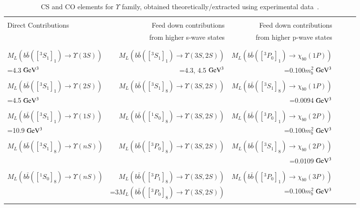 \normalsize
\begin{table}
  \centering
  \caption{CS and CO elements for $\Upsilon$ family, obtained theoretically/extracted using experimental data~\cite{Sharma:2012dy,Feng:2015wka}.}
  \footnotesize
  \begin{tabular*}{\textwidth}{@{\extracolsep{\fill}}lrrrrl@{}}
    \hline
    \hline
    & & \\ 
    Direct Contributions & Feed down contributions & Feed down contributions \\
    & from higher s-wave states & from higher p-wave states \\ \\
    \hline 
    & & \\
    $M_L(b\bar{b}([^3S_1]_1)\rightarrow\Upsilon(3S))$ & $M_L(b\bar{b}([^3S_1]_1)\rightarrow\Upsilon(3S,2S))$
    & $M_L(b\bar{b}([^3P_0]_1)\rightarrow\chi_{b0}(1P))$ \\
    =4.3 ${\rm GeV^3}$ & =4.3, 4.5 ${\rm GeV^3}$ & =0.100$m_b^2$ ${\rm GeV^3}$ \\ \\
    
    $M_L(b\bar{b}([^3S_1]_1)\rightarrow\Upsilon(2S))$ & $M_L(b\bar{b}([^3S_1]_8)\rightarrow\Upsilon(3S,2S))$
    & $M_L(b\bar{b}([^3S_1]_8)\rightarrow\chi_{b0}(1P))$ \\
    =4.5 ${\rm GeV^3}$ & & =0.0094 ${\rm GeV^3}$ \\ \\
    
    $M_L(b\bar{b}([^3S_1]_1)\rightarrow\Upsilon(1S))$ & $M_L(b\bar{b}([^1S_0]_8)\rightarrow\Upsilon(3S,2S))$
    & $M_L(b\bar{b}([^3P_0]_1)\rightarrow\chi_{b0}(2P))$ \\
    =10.9 ${\rm GeV^3}$ &  & =0.100$m_b^2$ ${\rm GeV^3}$ \\ \\
    
    $M_L(b\bar{b}([^3S_1]_8)\rightarrow\Upsilon(nS))$ & $M_L(b\bar{b}([^3P_0]_8)\rightarrow\Upsilon(3S,2S))$
    & $M_L(b\bar{b}([^3S_1]_8)\rightarrow\chi_{b0}(2P))$ \\
    &  & =0.0109 ${\rm GeV^3}$ \\ \\
    
    $M_L(b\bar{b}([^1S_0]_8)\rightarrow\Upsilon(nS))$ & $M_L(b\bar{b}([^3P_1]_8)\rightarrow\Upsilon(3S,2S))$ &$M_L(b\bar{b}([^3P_0]_1)\rightarrow\chi_{b0}(3P))$ \\
    & =3$M_L(b\bar{b}([^3P_0]_8)\rightarrow\Upsilon(3S,2S))$ &=0.100$m_b^2$ ${\rm GeV^3}$  \\ \\
    

\end{tabular*}
\end{table}
